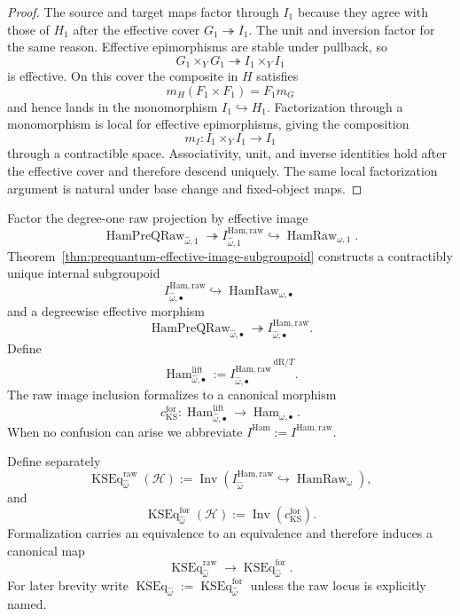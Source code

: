 \begin{proof}
The source and target maps factor through $I_1$ because they agree with those of
$H_1$ after the effective cover $G_1\twoheadrightarrow I_1$.  The unit and
inversion factor for the same reason.  Effective epimorphisms are stable under
pullback, so
\[
G_1\times_YG_1\twoheadrightarrow I_1\times_YI_1
\]
is effective.  On this cover the composite in $H$ satisfies
\[
m_H(F_1\times F_1)=F_1m_G
\]
and hence lands in the monomorphism $I_1\hookrightarrow H_1$.  Factorization
through a monomorphism is local for effective epimorphisms, giving the
composition
\[
m_I:I_1\times_YI_1\longrightarrow I_1
\]
through a contractible space.  Associativity, unit, and inverse identities hold
after the effective cover and therefore descend uniquely.  The same local
factorization argument is natural under base change and fixed-object maps.
\end{proof}

\begin{construction}
\label{constr:prequantum-liftable-hamiltonian-image}
Factor the degree-one raw projection by effective image
\[
\operatorname{HamPreQRaw}_{\widehat\omega,1}
\twoheadrightarrow
I^{\mathrm{Ham,raw}}_{\widehat\omega,1}
\hookrightarrow
\operatorname{HamRaw}_{\omega,1}.
\]
Theorem~\ref{thm:prequantum-effective-image-subgroupoid} constructs a contractibly unique
internal subgroupoid
\[
I^{\mathrm{Ham,raw}}_{\widehat\omega,\bullet}
\hookrightarrow
\operatorname{HamRaw}_{\omega,\bullet}
\]
and a degreewise effective morphism
\[
\operatorname{HamPreQRaw}_{\widehat\omega,\bullet}
\twoheadrightarrow
I^{\mathrm{Ham,raw}}_{\widehat\omega,\bullet}.
\]
Define
\[
\boxed{
\operatorname{Ham}^{\mathrm{lift}}_{\widehat\omega,\bullet}
:=
\widehat{I^{\mathrm{Ham,raw}}_{\widehat\omega,\bullet}}^{\,\mathrm{dR}/T}.
}
\]
The raw image inclusion formalizes to a canonical morphism
\[
c_{\mathrm{KS}}^{\mathrm{for}}:
\operatorname{Ham}^{\mathrm{lift}}_{\widehat\omega,\bullet}
\longrightarrow
\operatorname{Ham}_{\omega,\bullet}.
\]
When no confusion can arise we abbreviate
$I^{\mathrm{Ham}}:=I^{\mathrm{Ham,raw}}$.
\end{construction}

\begin{definition}
\label{def:prequantum-hamiltonian-liftability-inverse-locus}
Define separately
\[
\boxed{
\operatorname{KSEq}^{\mathrm{raw}}_{\widehat\omega}(\mathcal H)
:=
\operatorname{Inv}
\left(
I^{\mathrm{Ham,raw}}_{\widehat\omega}
\hookrightarrow
\operatorname{HamRaw}_{\omega}
\right),
}
\]
and
\[
\boxed{
\operatorname{KSEq}^{\mathrm{for}}_{\widehat\omega}(\mathcal H)
:=
\operatorname{Inv}(c_{\mathrm{KS}}^{\mathrm{for}}).
}
\]
Formalization carries an equivalence to an equivalence and therefore induces a
canonical map
\[
\operatorname{KSEq}^{\mathrm{raw}}_{\widehat\omega}
\longrightarrow
\operatorname{KSEq}^{\mathrm{for}}_{\widehat\omega}.
\]
For later brevity write
$\operatorname{KSEq}_{\widehat\omega}:=
\operatorname{KSEq}^{\mathrm{for}}_{\widehat\omega}$ unless the raw locus is
explicitly named.
\end{definition}

